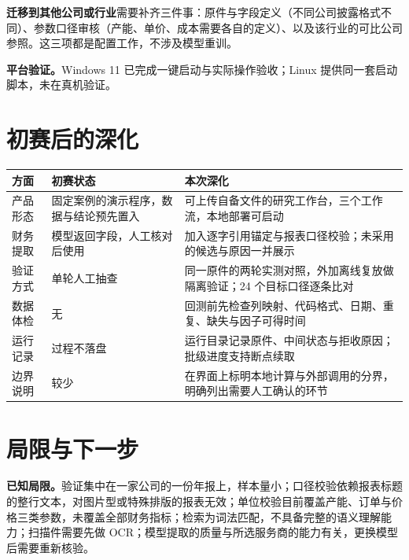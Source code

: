 \documentclass[11pt,a4paper]{ctexart}
\begin{document}
\textbf{迁移到其他公司或行业}需要补齐三件事：原件与字段定义（不同公司披露格式不同）、参数口径审核（产能、单价、成本需要各自的定义）、以及该行业的可比公司参照。这三项都是配置工作，不涉及模型重训。

\textbf{平台验证。}Windows 11 已完成一键启动与实际操作验收；Linux 提供同一套启动脚本，未在真机验证。

\section{初赛后的深化}

\begin{tabularx}{\textwidth}{@{}p{} X X@{}}
\toprule
\sffamily\bfseries 方面 & \sffamily\bfseries 初赛状态 & \sffamily\bfseries 本次深化 \\
\midrule
产品形态 &
固定案例的演示程序，数据与结论预先置入 &
可上传自备文件的研究工作台，三个工作流，本地部署可启动 \\
\midrule
财务提取 &
模型返回字段，人工核对后使用 &
加入逐字引用锚定与报表口径校验；未采用的候选与原因一并展示 \\
\midrule
验证方式 &
单轮人工抽查 &
同一原件的两轮实测对照，外加离线复放做隔离验证；24 个目标口径逐条比对 \\
\midrule
数据体检 &
无 &
回测前先检查列映射、代码格式、日期、重复、缺失与因子可得时间 \\
\midrule
运行记录 &
过程不落盘 &
运行目录记录原件、中间状态与拒收原因；批级进度支持断点续取 \\
\midrule
边界说明 &
较少 &
在界面上标明本地计算与外部调用的分界，明确列出需要人工确认的环节 \\
\bottomrule
\end{tabularx}

\section{局限与下一步}

\textbf{已知局限。}验证集中在一家公司的一份年报上，样本量小；口径校验依赖报表标题的整行文本，对图片型或特殊排版的报表无效；单位校验目前覆盖产能、订单与价格三类参数，未覆盖全部财务指标；检索为词法匹配，不具备完整的语义理解能力；扫描件需要先做 OCR；模型提取的质量与所选服务商的能力有关，更换模型后需要重新核验。
\end{document}
